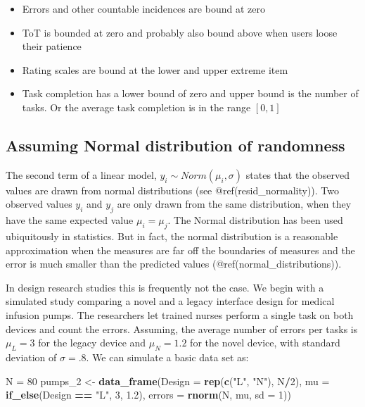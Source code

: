 \documentclass[]{svmono}
\newenvironment{Shaded}{\begin{snugshade}}{\end{snugshade}}
\newcommand{\KeywordTok}[1]{\textcolor[rgb]{0.13,0.29,0.53}{\textbf{#1}}}
\newcommand{\DataTypeTok}[1]{\textcolor[rgb]{0.13,0.29,0.53}{#1}}
\newcommand{\DecValTok}[1]{\textcolor[rgb]{0.00,0.00,0.81}{#1}}
\newcommand{\FloatTok}[1]{\textcolor[rgb]{0.00,0.00,0.81}{#1}}
\newcommand{\StringTok}[1]{\textcolor[rgb]{0.31,0.60,0.02}{#1}}
\newcommand{\OperatorTok}[1]{\textcolor[rgb]{0.81,0.36,0.00}{\textbf{#1}}}
\newcommand{\NormalTok}[1]{#1}
\providecommand{\tightlist}{%
  \setlength{\itemsep}{0pt}\setlength{\parskip}{0pt}}
\theoremstyle{definition}
\theoremstyle{definition}
\theoremstyle{definition}
\theoremstyle{remark}
\begin{document}
\begin{itemize}
\tightlist
\item
  Errors and other countable incidences are bound at zero
\item
  ToT is bounded at zero and probably also bound above when users loose
  their patience
\item
  Rating scales are bound at the lower and upper extreme item
\item
  Task completion has a lower bound of zero and upper bound is the
  number of tasks. Or the average task completion is in the range
  \([0,1]\)
\end{itemize}

\subsection{Assuming Normal distribution of
randomness}\label{assuming-normal-distribution-of-randomness}

The second term of a linear model, \(y_i \sim Norm(\mu_i, \sigma)\)
states that the observed values are drawn from normal distributions (see
@ref(resid\_normality)). Two observed values \(y_i\) and \(y_j\) are
only drawn from the same distribution, when they have the same expected
value \(\mu_i = \mu_j\). The Normal distribution has been used
ubiquitously in statistics. But in fact, the normal distribution is a
reasonable approximation when the measures are far off the boundaries of
measures and the error is much smaller than the predicted values
(@ref(normal\_distributions)).

In design research studies this is frequently not the case. We begin
with a simulated study comparing a novel and a legacy interface design
for medical infusion pumps. The researchers let trained nurses perform a
single task on both devices and count the errors. Assuming, the average
number of errors per tasks is \(\mu_L = 3\) for the legacy device and
\(\mu_N = 1.2\) for the novel device, with standard deviation of
\(\sigma = .8\). We can simulate a basic data set as:

\begin{Shaded}
\begin{Highlighting}[]
\NormalTok{N =}\StringTok{ }\DecValTok{80}
\NormalTok{pumps_}\DecValTok{2}\NormalTok{ <-}\StringTok{ }
\StringTok{  }\KeywordTok{data_frame}\NormalTok{(}\DataTypeTok{Design =} \KeywordTok{rep}\NormalTok{(}\KeywordTok{c}\NormalTok{(}\StringTok{"L"}\NormalTok{, }\StringTok{"N"}\NormalTok{), N}\OperatorTok{/}\DecValTok{2}\NormalTok{),}
             \DataTypeTok{mu =} \KeywordTok{if_else}\NormalTok{(Design }\OperatorTok{==}\StringTok{ "L"}\NormalTok{, }\DecValTok{3}\NormalTok{, }\FloatTok{1.2}\NormalTok{),}
             \DataTypeTok{errors =} \KeywordTok{rnorm}\NormalTok{(N, mu, }\DataTypeTok{sd =} \DecValTok{1}\NormalTok{))}
\end{Highlighting}
\end{Shaded}
\end{document}
